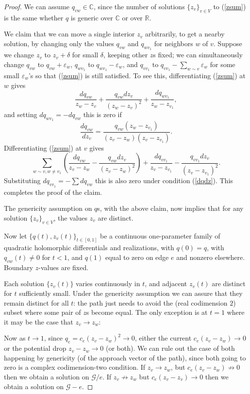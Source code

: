 \documentclass[12pt]{amsart}
\newcommand{\C}{{\mathbb C}}
\newcommand{\R}{{\mathbb R}}
\newcommand{\G}{{\mathcal G}}
\newcommand{\eps}{\varepsilon}
\newcommand{\be}{\begin{equation}}
\newcommand{\ee}{\end{equation}}
\begin{document}
\begin{proof}
We can assume $q_{vw}\in\C$, since the number of solutions $\{z_v\}_{v\in V}$ to 
(\ref{zsum}) is the same whether $q$ is generic over $\C$ or over $\R$. 

We claim that we can move a single interior $z_v$ arbitrarily, 
to get a nearby solution, by changing only the values $q_{vw}$ and $q_{wv_1}$ for neighbors $w$ of $v$. 
Suppose we change $z_v$ to $z_v+\delta$ for small $\delta$, keeping other $z$s fixed; 
we can simultaneously change $q_{vw}$ to $q_{vw}+\eps_w$, $q_{wv_1}$ to $q_{wv_1}-\eps_w$, and 
$q_{vv_1}$ to $q_{vv_1}-\sum_{w\sim v}\eps_w$ for some small $\eps_w$'s so that (\ref{zsum}) is still satisfied. 
To see this, differentiating (\ref{zsum}) at $w$ gives
$$\frac{dq_{vw}}{z_w-z_v} + \frac{q_{vw}dz_v}{(z_w-z_v)^2} + \frac{dq_{wv_1}}{z_w-z_{v_1}},$$
and setting $dq_{wv_1}=-dq_{vw}$ this is zero if
\be\label{dqdz}\frac{dq_{vw}}{dz_v} = \frac{q_{vw}(z_w-z_{v_1})}{(z_v-z_w)(z_v-z_{v_1})}.\ee
Differentiating (\ref{zsum}) at $v$ gives
$$\sum_{w\sim v, w\ne v_1} \left(\frac{dq_{vw}}{z_v-z_w}-\frac{q_{vw}dz_v}{(z_v-z_w)^2}\right)+
\frac{dq_{vv_1}}{z_v-z_{v_1}}-\frac{q_{vv_1}dz_v}{(z_v-z_{v_1})^2}.$$
Substituting $dq_{vv_1} = -\sum dq_{vw}$ this is also zero under condition (\ref{dqdz}). This completes the proof of the claim.

The genericity assumption on $q$s, with the above claim, now implies that for any solution $\{z_v\}_{v\in V}$, 
the values $z_v$ are distinct.

Now let $\{q(t), z_v(t)\}_{t\in[0,1]}$ be a continuous one-parameter family of quadratic holomorphic differentials
and realizations, with $q(0)=q$, with $q_{vw}(t)\ne0$ for $t<1$,
and $q(1)$ equal to zero on edge $e$ and nonzero elsewhere. Boundary $z$-values are fixed.
 
Each solution $\{z_v(t)\}$ varies continuously in $t$, and adjacent $z_v(t)$ are distinct for $t$ sufficiently small.
Under the genericity assumption we can assure that they remain distinct for all $t$: the path
just needs to avoid the (real codimension $2$) subset where some pair of $z$s become equal. 
The only exception is at $t=1$ where it may be the case that $z_v\to z_w$:

Now as $t\to1$, since $q_e=c_e(z_v-z_w)^2\to0$, either the current $c_e(z_v-z_w)\to0$ or the potential drop $z_v-z_w\to0$ (or both). 
We can rule out the case of both happening by genericity (of the approach vector of the path), 
since both going to zero is a complex codimension-two condition.
If $z_v\to z_w$, but $c_e(z_v-z_w)\not\to0$ then we obtain a solution on $\G/e$. If $z_v\not\to z_w$ but $c_e(z_v-z_v)\to0$ 
then we obtain a solution on $\G-e$. 


\end{proof}
\end{document}
